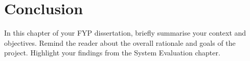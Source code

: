 \chapter{Conclusion} \label{cha:conclusion}
In this chapter of your FYP dissertation, briefly summarise your context and
objectives.
Remind the reader about the overall rationale and goals of the
project. Highlight your findings from the System Evaluation chapter.
